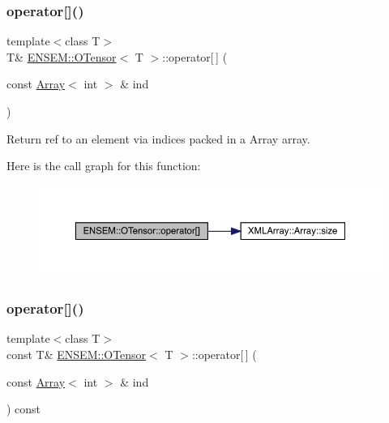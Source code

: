 \subsubsection{\texorpdfstring{operator[]()}{operator[]()}\hspace{0.1cm}{\footnotesize\ttfamily [2/4]}}
{\footnotesize\ttfamily template$<$class T$>$ \\
T\& \mbox{\hyperlink{classENSEM_1_1OTensor}{E\+N\+S\+E\+M\+::\+O\+Tensor}}$<$ T $>$\+::operator\mbox{[}$\,$\mbox{]} (\begin{DoxyParamCaption}\item[{const \mbox{\hyperlink{classXMLArray_1_1Array}{Array}}$<$ int $>$ \&}]{ind }\end{DoxyParamCaption})\hspace{0.3cm}{\ttfamily [inline]}}



Return ref to an element via indices packed in a Array array. 

Here is the call graph for this function\+:
\nopagebreak
\begin{figure}[H]
\begin{center}
\leavevmode
\includegraphics[width=350pt]{da/d8a/classENSEM_1_1OTensor_adbfded2bb2af9d68e0a040df0d19b2d6_cgraph}
\end{center}
\end{figure}
\mbox{\label{classENSEM_1_1OTensor_aa649ae52fc364d173eb02db2fbee8172}} 
\subsubsection{\texorpdfstring{operator[]()}{operator[]()}\hspace{0.1cm}{\footnotesize\ttfamily [3/4]}}
{\footnotesize\ttfamily template$<$class T$>$ \\
const T\& \mbox{\hyperlink{classENSEM_1_1OTensor}{E\+N\+S\+E\+M\+::\+O\+Tensor}}$<$ T $>$\+::operator\mbox{[}$\,$\mbox{]} (\begin{DoxyParamCaption}\item[{const \mbox{\hyperlink{classXMLArray_1_1Array}{Array}}$<$ int $>$ \&}]{ind }\end{DoxyParamCaption}) const\hspace{0.3cm}{\ttfamily [inline]}}



